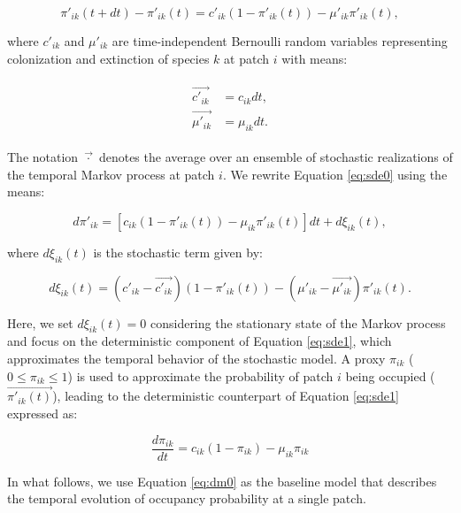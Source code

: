 \documentclass[11pt, class=article, crop=false]{standalone}
\theoremstyle{definition}
\begin{document}
\begin{equation}
    \pi'_{ik}(t + dt) - \pi'_{ik}(t) = c'_{ik} (1 - \pi'_{ik}(t)) - \mu'_{ik} \pi'_{ik}(t),
    \label{eq:sde0}
\end{equation}

where $c'_{ik}$ and $\mu'_{ik}$ are time-independent Bernoulli random variables representing colonization and extinction  of species $k$ at patch $i$ with means:

\begin{align}
    \begin{split}
        \overrightarrow{c'_{ik}} &= c_{ik} dt,\\
        \overrightarrow{\mu'_{ik}} &= \mu_{ik} dt.
    \end{split}
\end{align}

The notation $\overrightarrow{\cdot}$ denotes the average over an ensemble of stochastic realizations of the temporal Markov process at patch $i$.
We rewrite Equation \ref{eq:sde0} using the means:

\begin{equation}
    d \pi'_{ik} = [c_{ik} (1 - \pi'_{ik}(t)) - \mu_{ik} \pi'_{ik}(t)]dt + d\xi_{ik}(t),
    \label{eq:sde1}
\end{equation}

where $d\xi_{ik}(t)$ is the stochastic term given by:

\begin{equation}
    d\xi_{ik}(t) = (c'_{ik} - \overrightarrow{c'_{ik}}) (1 - \pi'_{ik}(t)) - (\mu'_{ik} - \overrightarrow{\mu'_{ik}}) \pi'_{ik}(t).
\end{equation}

Here, we set $d\xi_{ik}(t) = 0$ considering the stationary state of the Markov process and focus on the deterministic component of Equation \ref{eq:sde1}, which approximates the temporal behavior of the stochastic model.
A proxy $\pi_{ik}$ ($0 \le \pi_{ik} \le 1$) is used to approximate the probability of patch $i$ being occupied ($\overrightarrow{\pi'_{ik}(t)}$), leading to the deterministic counterpart of Equation \ref{eq:sde1} expressed as:

\begin{equation}
    \frac{d \pi_{ik}}{d t} = c_{ik} (1 - \pi_{ik}) - \mu_{ik} \pi_{ik}
    \label{eq:dm0}
\end{equation}

In what follows, we use Equation \ref{eq:dm0} as the baseline model that describes the temporal evolution of occupancy probability at a single patch.
\end{document}
